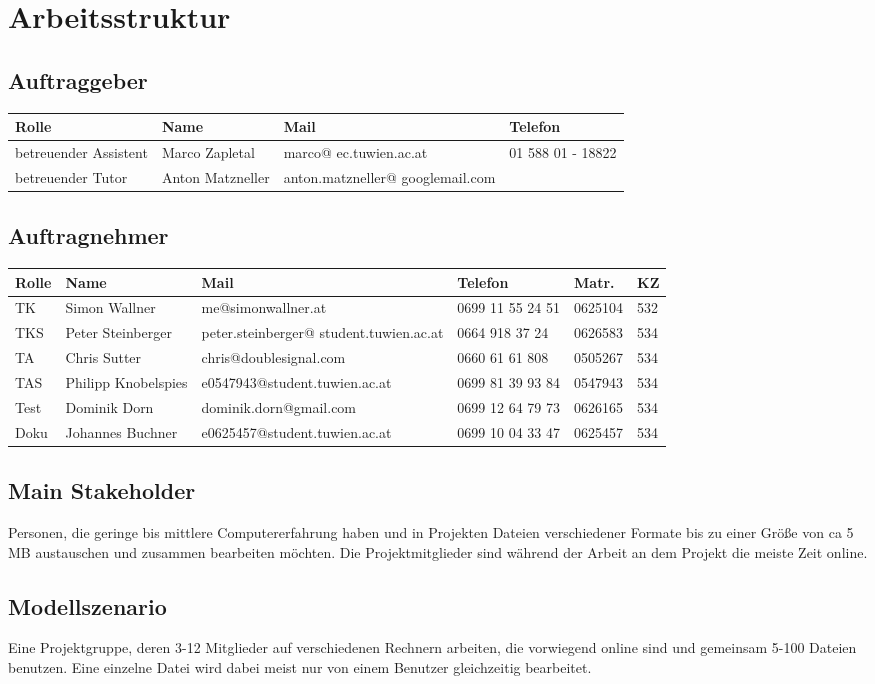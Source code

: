 
\section{Arbeitsstruktur}
\subsection{Auftraggeber}
\begin{tabular}{ | l | l | p{3.5cm} | p{4cm} |}
\hline
\textbf{Rolle} & \textbf{Name} & \textbf{Mail} & \textbf{Telefon} \\
\hline
betreuender Assistent & Marco Zapletal & marco@ ec.tuwien.ac.at & 01 588 01 - 18822 \\
\hline
betreuender Tutor & Anton Matzneller & anton.matzneller@ googlemail.com &  \\
\hline
\end{tabular}

\subsection{Auftragnehmer}
\begin{tabular}{ | l | l | p{5.5cm} | p{1.7cm} | l | l |}
\hline
\textbf{Rolle} & \textbf{Name} & \textbf{Mail} & \textbf{Telefon} & \textbf{Matr.} & \textbf{KZ} \\
\hline
TK & Simon Wallner & me@simonwallner.at & 0699 11 55 24 51 & 0625104 & 532 \\
\hline
TKS & Peter Steinberger & peter.steinberger@ student.tuwien.ac.at & 0664 918 37 24 & 0626583 & 534 \\
\hline
TA & Chris Sutter & chris@doublesignal.com & 0660 61 61 808 & 0505267 & 534 \\
\hline
TAS & Philipp Knobelspies & e0547943@student.tuwien.ac.at & 0699 81 39 93 84 & 0547943 & 534 \\
\hline
Test & Dominik Dorn & dominik.dorn@gmail.com & 0699 12 64 79 73 & 0626165 & 534 \\
\hline
Doku & Johannes Buchner & e0625457@student.tuwien.ac.at & 0699 10 04 33 47 & 0625457 & 534 \\
\hline
\end{tabular}

\subsection{Main Stakeholder}
Personen, die geringe bis mittlere Computererfahrung haben und in Projekten Dateien verschiedener Formate bis zu einer Größe von ca 5 MB austauschen und zusammen bearbeiten möchten. Die Projektmitglieder sind während der Arbeit an dem Projekt die meiste Zeit online.
\subsection{Modellszenario}

Eine Projektgruppe, deren 3-12 Mitglieder auf verschiedenen Rechnern arbeiten, die vorwiegend online sind und gemeinsam 5-100 Dateien benutzen. Eine einzelne Datei wird dabei meist nur von einem Benutzer gleichzeitig bearbeitet.
